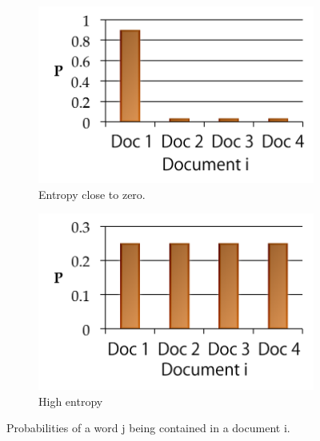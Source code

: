\documentclass[review]{elsarticle}
\begin{document}
\begin{figure}[bp]
    \centering
    \begin{subfigure}[b]{0.4\linewidth}
        \includegraphics[width=\linewidth]{entropyzero.png}
        \caption{Entropy close to zero.}
    \end{subfigure}
    \begin{subfigure}[b]{0.4\linewidth}
        \includegraphics[width=\linewidth]{entropyhigh.png}
        \caption{High entropy}
    \end{subfigure}
\caption{Probabilities of a word j being contained in a document i.}
\label{fig:entropygraphs}
\end{figure}
\end{document}
